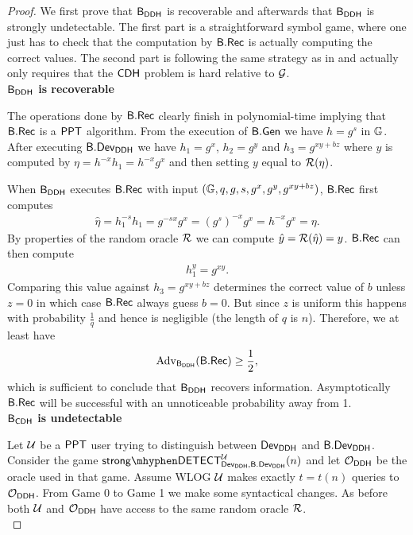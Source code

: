 \begin{proof}
We first prove that $\mathsf{B}_{\mathsf{DDH}}$ is recoverable and afterwards that $\mathsf{B}_{\mathsf{DDH}}$ is strongly undetectable. The first part is a straightforward symbol game, where one just has to check that the computation by $\mathsf{B}.\mathsf{Rec}$ is actually computing the correct values. The second part is following the same strategy as in  and actually only requires that the $\mathsf{CDH}$ problem is hard relative to $\operatorname{\mathcal{G}}$. \\

\noindent\textbf{$\mathsf{B}_{\mathsf{DDH}}$ is recoverable} 

The operations done by $\mathsf{B}.\mathsf{Rec}$ clearly finish in polynomial-time implying that $\mathsf{B}.\mathsf{Rec}$ is a $\mathsf{PPT}$ algorithm. From the execution of $\mathsf{B}.\mathsf{Gen}$ we have $h=g^s$ in $\mathbb{G}$. After executing $\mathsf{B}.\mathsf{Dev}_{\mathsf{DDH}}$ we have $h_1=g^x$, $h_2=g^y$ and $h_3 = g^{xy+bz}$ where $y$ is computed by $\eta=h^{-x}h_1=h^{-x}g^x$ and then setting $y$ equal to $\operatorname{\mathcal{R}}(\eta)$. 

When $\mathsf{B}_{\mathsf{DDH}}$ executes $\mathsf{B}.\mathsf{Rec}$ with input $(\mathbb{G},q,g,s,g^x,g^y,g^{xy+bz})$, $\mathsf{B}.\mathsf{Rec}$ first computes
\begin{align*}
	\hat{\eta} = h_1^{-s}h_1 = g^{-sx}g^x = (g^s)^{-x}g^x = h^{-x}g^x = \eta.
\end{align*}
By properties of the random oracle $\operatorname{\mathcal{R}}$ we can compute $\hat{y}=\operatorname{\mathcal{R}}(\hat{\eta}) = y$. $\mathsf{B}.\mathsf{Rec}$ can then compute
\begin{align*}
	h_1^y = g^{xy}.
\end{align*}
Comparing this value against $h_3 = g^{xy+bz}$ determines the correct value of $b$ unless $z = 0$ in which case $\mathsf{B}.\mathsf{Rec}$ always guess $b = 0$. But since $z$ is uniform this happens with probability $\frac{1}{q}$ and hence is negligible (the length of $q$ is $n$). Therefore, we at least have
\begin{align*}
	\operatorname{Adv}_{\mathsf{B}_{\mathsf{DDH}}}(\mathsf{B}.\mathsf{Rec}) \geq \frac{1}{2},
\end{align*} 
which is sufficient to conclude that $\mathsf{B}_{\mathsf{DDH}}$ recovers information. Asymptotically $\mathsf{B}.\mathsf{Rec}$ will be successful with an unnoticeable probability away from 1.\\

\noindent\textbf{$\mathsf{B}_{\mathsf{CDH}}$ is undetectable}

Let $\mathcal{U}$ be a $\mathsf{PPT}$ user trying to distinguish between $\operatorname{\mathsf{Dev}}_{\mathsf{DDH}}$ and $\mathsf{B}.\mathsf{Dev}_{\mathsf{DDH}}$. Consider the game $\strongdetect{\dev_{\DDH}}{\bbdev_{\DDH}}{\user}$ and let $\operatorname{\mathcal{O}}_{\mathsf{DDH}}$ be the oracle used in that game. Assume WLOG $\mathcal{U}$ makes exactly $t = t(n)$ queries to $\operatorname{\mathcal{O}}_{\mathsf{DDH}}$. From Game 0 to Game 1 we make some syntactical changes. As before both $\mathcal{U}$ and $\operatorname{\mathcal{O}}_{\mathsf{DDH}}$ have access to the same random oracle $\operatorname{\mathcal{R}}$. \\


\end{proof}
